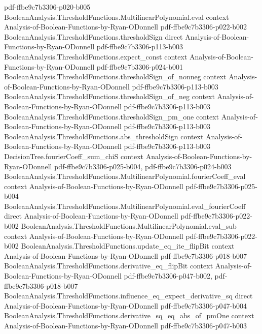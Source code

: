 \begin{lemma}
  {pdf-ffbe9c7b3306-p020-b005}
\proofstep
  {BooleanAnalysis.ThresholdFunctions.MultilinearPolynomial.eval}
  {context}
  {Analysis-of-Boolean-Functions-by-Ryan-ODonnell}
  {pdf-ffbe9c7b3306-p022-b002}
\proofstep
  {BooleanAnalysis.ThresholdFunctions.thresholdSign}
  {direct}
  {Analysis-of-Boolean-Functions-by-Ryan-ODonnell}
  {pdf-ffbe9c7b3306-p113-b003}
\proofstep
  {BooleanAnalysis.ThresholdFunctions.expect_const}
  {context}
  {Analysis-of-Boolean-Functions-by-Ryan-ODonnell}
  {pdf-ffbe9c7b3306-p024-b001}
\proofstep
  {BooleanAnalysis.ThresholdFunctions.thresholdSign_of_nonneg}
  {context}
  {Analysis-of-Boolean-Functions-by-Ryan-ODonnell}
  {pdf-ffbe9c7b3306-p113-b003}
\proofstep
  {BooleanAnalysis.ThresholdFunctions.thresholdSign_of_neg}
  {context}
  {Analysis-of-Boolean-Functions-by-Ryan-ODonnell}
  {pdf-ffbe9c7b3306-p113-b003}
\proofstep
  {BooleanAnalysis.ThresholdFunctions.thresholdSign_pm_one}
  {context}
  {Analysis-of-Boolean-Functions-by-Ryan-ODonnell}
  {pdf-ffbe9c7b3306-p113-b003}
\proofstep
  {BooleanAnalysis.ThresholdFunctions.abs_thresholdSign}
  {context}
  {Analysis-of-Boolean-Functions-by-Ryan-ODonnell}
  {pdf-ffbe9c7b3306-p113-b003}
\proofstep
  {DecisionTree.fourierCoeff_sum_chiS}
  {context}
  {Analysis-of-Boolean-Functions-by-Ryan-ODonnell}
  {pdf-ffbe9c7b3306-p025-b004,
    pdf-ffbe9c7b3306-p024-b003}
\proofstep
  {BooleanAnalysis.ThresholdFunctions.MultilinearPolynomial.fourierCoeff_eval}
  {context}
  {Analysis-of-Boolean-Functions-by-Ryan-ODonnell}
  {pdf-ffbe9c7b3306-p025-b004}
\proofstep
  {BooleanAnalysis.ThresholdFunctions.MultilinearPolynomial.eval_fourierCoeff}
  {direct}
  {Analysis-of-Boolean-Functions-by-Ryan-ODonnell}
  {pdf-ffbe9c7b3306-p022-b002}
\proofstep
  {BooleanAnalysis.ThresholdFunctions.MultilinearPolynomial.eval_sub}
  {context}
  {Analysis-of-Boolean-Functions-by-Ryan-ODonnell}
  {pdf-ffbe9c7b3306-p022-b002}
\proofstep
  {BooleanAnalysis.ThresholdFunctions.update_eq_ite_flipBit}
  {context}
  {Analysis-of-Boolean-Functions-by-Ryan-ODonnell}
  {pdf-ffbe9c7b3306-p018-b007}
\proofstep
  {BooleanAnalysis.ThresholdFunctions.derivative_eq_flipBit}
  {context}
  {Analysis-of-Boolean-Functions-by-Ryan-ODonnell}
  {pdf-ffbe9c7b3306-p047-b002,
    pdf-ffbe9c7b3306-p018-b007}
\proofstep
  {BooleanAnalysis.ThresholdFunctions.influence_eq_expect_derivative_sq}
  {direct}
  {Analysis-of-Boolean-Functions-by-Ryan-ODonnell}
  {pdf-ffbe9c7b3306-p047-b004}
\proofstep
  {BooleanAnalysis.ThresholdFunctions.derivative_sq_eq_abs_of_pmOne}
  {context}
  {Analysis-of-Boolean-Functions-by-Ryan-ODonnell}
  {pdf-ffbe9c7b3306-p047-b003}

\end{lemma}
